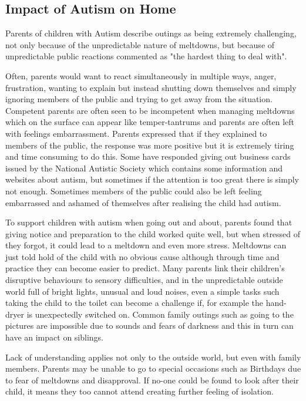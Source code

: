 \subsection{Impact of Autism on Home}
Parents of children with Autism describe outings as being extremely challenging, not only because of the unpredictable nature of meltdowns, but because of unpredictable public reactions\cite{meltdowns_goingout} commented as "the hardest thing to deal with"\cite{meltdowns_goingout}.

Often, parents would want to react simultaneously in multiple ways, anger, frustration, wanting to explain but instead shutting down themselves and simply ignoring members of the public and trying to get away from the situation\cite{meltdowns_goingout}. Competent parents are often seen to be incompetent when managing meltdowns which on the surface can appear like temper-tantrums and parents are often left with feelings embarrassment\cite{meltdowns_goingout}. Parents expressed that if they explained to members of the public, the response was more positive but it is extremely tiring and time consuming to do this\cite{meltdowns_goingout}. Some have responded giving out business cards issued by the National Autistic Society which contains some information and websites about autism, but sometimes if the attention is too great there is simply not enough. Sometimes members of the public could also be left feeling embarrassed and ashamed of themselves after realising the child had autism\cite{meltdowns_goingout}.  

To support children with autism when going out and about, parents found that giving notice and preparation to the child worked quite well, but when stressed of they forgot, it could lead to a meltdown and even more stress\cite{meltdowns_goingout}. Meltdowns can just told hold of the child with no obvious cause although through time and practice they can become easier to predict. Many parents link their children's disruptive behaviours to sensory difficulties, and in the unpredictable outside world full of bright lights, unusual and loud noises, even a simple tasks such taking the child to the toilet can become a challenge if, for example the hand-dryer is unexpectedly switched on\cite{meltdowns_goingout}. Common family outings such as going to the pictures are impossible due to sounds and fears of darkness and this in turn can have an impact on siblings.  

Lack of understanding applies not only to the outside world, but even with family members\cite{meltdowns_goingout}. Parents may be unable to go to special occasions such as Birthdays due to fear of meltdowns and disapproval. If no-one could be found to look after their child, it means they too cannot attend creating further feeling of isolation.

